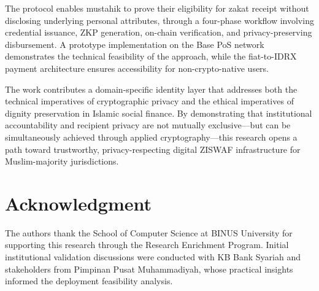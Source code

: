 \documentclass[conference]{IEEEtran}
\begin{document}
The protocol enables mustahik to prove their eligibility for zakat receipt without disclosing underlying personal attributes, through a four-phase workflow involving credential issuance, ZKP generation, on-chain verification, and privacy-preserving disbursement. A prototype implementation on the Base PoS network demonstrates the technical feasibility of the approach, while the fiat-to-IDRX payment architecture ensures accessibility for non-crypto-native users.

The work contributes a domain-specific identity layer that addresses both the technical imperatives of cryptographic privacy and the ethical imperatives of dignity preservation in Islamic social finance. By demonstrating that institutional accountability and recipient privacy are not mutually exclusive---but can be simultaneously achieved through applied cryptography---this research opens a path toward trustworthy, privacy-respecting digital ZISWAF infrastructure for Muslim-majority jurisdictions.

\section*{Acknowledgment}

The authors thank the School of Computer Science at BINUS University for supporting this research through the Research Enrichment Program. Initial institutional validation discussions were conducted with KB Bank Syariah and stakeholders from Pimpinan Pusat Muhammadiyah, whose practical insights informed the deployment feasibility analysis.
\end{document}

